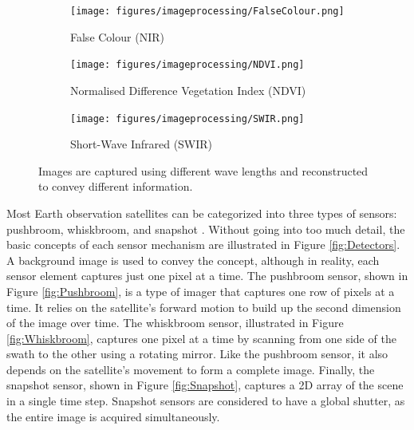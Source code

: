 \begin{figure}[H]
    \centering
    \begin{subfigure}[b]{0.32\linewidth}
        \centering
        \texttt{[image: figures/imageprocessing/FalseColour.png]}
        \caption{False Colour (NIR)}
        \label{fig:FalseColour}
    \end{subfigure}
    \hfill
    \begin{subfigure}[b]{0.32\linewidth}
        \centering
        \texttt{[image: figures/imageprocessing/NDVI.png]}
        \caption{Normalised Difference Vegetation Index (NDVI)}
        \label{fig:NDVI}
    \end{subfigure}
    \hfill
    \begin{subfigure}[b]{0.32\linewidth}
        \centering
        \texttt{[image: figures/imageprocessing/SWIR.png]}
        \caption{Short-Wave Infrared (SWIR)}
        \label{fig:SWIR}
    \end{subfigure}
    \caption{Images are captured using different wave lengths and reconstructed to convey different information.}
    \label{fig:MSI}
\end{figure}


Most Earth observation satellites can be categorized into three types of sensors: pushbroom, whiskbroom, and snapshot \cite{Fowler,Nag}. Without going into too 
much detail, the basic concepts of each sensor mechanism are illustrated in Figure \ref{fig:Detectors}. A background image is used to convey the concept, although 
in reality, each sensor element captures just one pixel at a time. The pushbroom sensor, shown in Figure \ref{fig:Pushbroom}, is a type of imager that captures one row of pixels at a time. It relies on the satellite's 
forward motion to build up the second dimension of the image over time. The whiskbroom sensor, illustrated in Figure \ref{fig:Whiskbroom}, captures one pixel at a time by scanning from one side of the swath to the other using a 
rotating mirror. Like the pushbroom sensor, it also depends on the satellite's movement to form a complete image. Finally, the snapshot sensor, shown in Figure \ref{fig:Snapshot}, captures a 2D array of the scene in a single time step. Snapshot sensors are considered to 
have a global shutter, as the entire image is acquired simultaneously.

